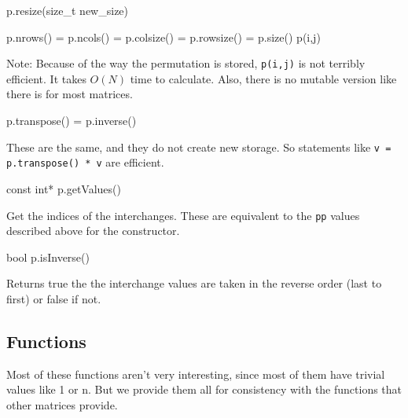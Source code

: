 \documentclass[twoside,letterpaper,11pt]{article}
\renewcommand{\tt}[1]{{\lstinline {#1}}}
\begin{document}
\begin{tmvcode}
p.resize(size_t new_size)
\end{tmvcode}

\begin{tmvcode}
p.nrows() = p.ncols() = p.colsize() = p.rowsize() = p.size()
p(i,j)
\end{tmvcode}
Note: Because of the way the permutation is stored, \tt{p(i,j)} is not
terribly efficient.  It takes $O(N)$ time to calculate.  Also, there is no
mutable version like there is for most matrices.

\begin{tmvcode}
p.transpose() = p.inverse()
\end{tmvcode}
These are the same, and they do not create new storage.  So statements like
\tt{v = p.transpose() * v} are efficient.

\begin{tmvcode}
const int* p.getValues()
\end{tmvcode}
Get the indices of the interchanges.  These are equivalent to the \tt{pp} values
described above for the constructor.

\begin{tmvcode}
bool p.isInverse()
\end{tmvcode}
Returns true the the interchange values are taken in the reverse order (last to first)
or false if not.
\vspace{12pt}

\subsection{Functions}
\label{Permutation_Functions}

Most of these functions aren't very interesting, since most of them have 
trivial values like 1 or n.  But we provide them all for consistency with the 
functions that other matrices provide.
\end{document}
